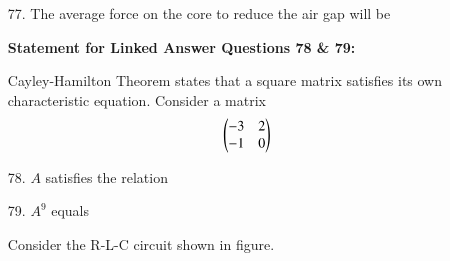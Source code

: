 \documentclass[journal,12pt,onecolumn]{IEEEtran}
\theoremstyle{remark}
\begin{document}
\begin{enumerate}
    \item [77.] The average force on the core to reduce the air gap will be
    \begin{enumerate}
    \end{enumerate}


\textbf{Statement for Linked Answer Questions 78 \& 79:}

Cayley-Hamilton Theorem states that a square matrix satisfies its own characteristic equation. Consider a matrix
\begin{align}
\begin{pmatrix} -3 & 2 \\
         -1 & 0 \end{pmatrix} 
\end{align}


    \item [78.] $A$ satisfies the relation
    \begin{enumerate}
    \end{enumerate}

    \item [79.] $A^9$ equals
    \begin{enumerate}
    \end{enumerate}




Consider the R-L-C circuit shown in figure.


\end{enumerate}
\end{document}
